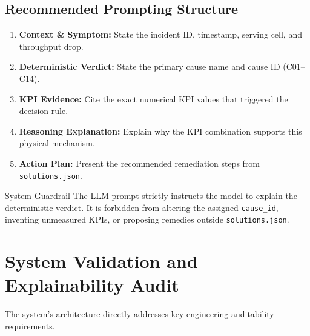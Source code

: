 \subsection{Recommended Prompting Structure}

\begin{enumerate}
\item \textbf{Context \& Symptom:} State the incident ID, timestamp, serving cell, and throughput drop.
\item \textbf{Deterministic Verdict:} State the primary cause name and cause ID (C01--C14).
\item \textbf{KPI Evidence:} Cite the exact numerical KPI values that triggered the decision rule.
\item \textbf{Reasoning Explanation:} Explain why the KPI combination supports this physical mechanism.
\item \textbf{Action Plan:} Present the recommended remediation steps from \texttt{solutions.json}.
\end{enumerate}

\begin{warningbox}{System Guardrail}
The LLM prompt strictly instructs the model to explain the deterministic verdict. It is forbidden from altering the assigned \texttt{cause\_id}, inventing unmeasured KPIs, or proposing remedies outside \texttt{solutions.json}.
\end{warningbox}

\section{System Validation and Explainability Audit}

The system's architecture directly addresses key engineering auditability requirements.

